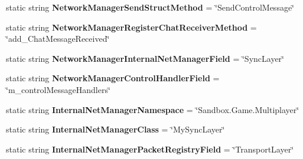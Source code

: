 \begin{DoxyCompactItemize}
\item 
\hypertarget{class_s_e_mod_a_p_i_internal_1_1_a_p_i_1_1_common_1_1_network_manager_a78e8dd2e659a063857163320cd53fe1c}{}static string {\bfseries Network\+Manager\+Send\+Struct\+Method} = \char`\"{}Send\+Control\+Message\char`\"{}\label{class_s_e_mod_a_p_i_internal_1_1_a_p_i_1_1_common_1_1_network_manager_a78e8dd2e659a063857163320cd53fe1c}

\item 
\hypertarget{class_s_e_mod_a_p_i_internal_1_1_a_p_i_1_1_common_1_1_network_manager_a58949e563db615b3b68cf2b9291104ab}{}static string {\bfseries Network\+Manager\+Register\+Chat\+Receiver\+Method} = \char`\"{}add\+\_\+\+Chat\+Message\+Received\char`\"{}\label{class_s_e_mod_a_p_i_internal_1_1_a_p_i_1_1_common_1_1_network_manager_a58949e563db615b3b68cf2b9291104ab}

\item 
\hypertarget{class_s_e_mod_a_p_i_internal_1_1_a_p_i_1_1_common_1_1_network_manager_af9d5246ff44c79797d1a8d8dc29257ae}{}static string {\bfseries Network\+Manager\+Internal\+Net\+Manager\+Field} = \char`\"{}Sync\+Layer\char`\"{}\label{class_s_e_mod_a_p_i_internal_1_1_a_p_i_1_1_common_1_1_network_manager_af9d5246ff44c79797d1a8d8dc29257ae}

\item 
\hypertarget{class_s_e_mod_a_p_i_internal_1_1_a_p_i_1_1_common_1_1_network_manager_a243106a92c2a0ea4ba514c88d9d04988}{}static string {\bfseries Network\+Manager\+Control\+Handler\+Field} = \char`\"{}m\+\_\+control\+Message\+Handlers\char`\"{}\label{class_s_e_mod_a_p_i_internal_1_1_a_p_i_1_1_common_1_1_network_manager_a243106a92c2a0ea4ba514c88d9d04988}

\item 
\hypertarget{class_s_e_mod_a_p_i_internal_1_1_a_p_i_1_1_common_1_1_network_manager_a5b8f16f962dbe3467346b8c0e19f2840}{}static string {\bfseries Internal\+Net\+Manager\+Namespace} = \char`\"{}Sandbox.\+Game.\+Multiplayer\char`\"{}\label{class_s_e_mod_a_p_i_internal_1_1_a_p_i_1_1_common_1_1_network_manager_a5b8f16f962dbe3467346b8c0e19f2840}

\item 
\hypertarget{class_s_e_mod_a_p_i_internal_1_1_a_p_i_1_1_common_1_1_network_manager_a0e0677a5a47b2ac7f81684085713d7e5}{}static string {\bfseries Internal\+Net\+Manager\+Class} = \char`\"{}My\+Sync\+Layer\char`\"{}\label{class_s_e_mod_a_p_i_internal_1_1_a_p_i_1_1_common_1_1_network_manager_a0e0677a5a47b2ac7f81684085713d7e5}

\item 
\hypertarget{class_s_e_mod_a_p_i_internal_1_1_a_p_i_1_1_common_1_1_network_manager_a07c23e999b2649b1d48557a78545ec0b}{}static string {\bfseries Internal\+Net\+Manager\+Packet\+Registry\+Field} = \char`\"{}Transport\+Layer\char`\"{}\label{class_s_e_mod_a_p_i_internal_1_1_a_p_i_1_1_common_1_1_network_manager_a07c23e999b2649b1d48557a78545ec0b}


\end{DoxyCompactItemize}
